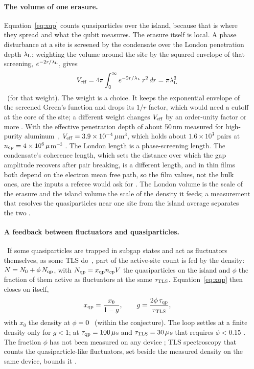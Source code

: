 \paragraph{The volume of one erasure.} Equation~\eqref{eq:xqp} counts quasiparticles over the island, because that is where they
spread and what the qubit measures. The erasure itself is local. A phase disturbance at a site is screened by the condensate over the
London penetration depth $\lambda_{\mathrm L}$; weighting the volume around the site by the squared envelope of that screening, $e^{-2r/\lambda_{\mathrm L}}$,
gives
\begin{equation}V_{\rm eff}=4\pi\int_0^\infty e^{-2r/\lambda_{\mathrm L}}\,r^2\,dr=\pi\lambda_{\mathrm L}^3\label{eq:xqp_veff}\end{equation}
\derived\ (for that weight). The weight is a choice. It keeps the exponential envelope of the screened Green's function and drops its
$1/r$ factor, which would need a cutoff at the core of the site; a different weight changes $V_{\rm eff}$ by an order-unity factor or
more \interp. With the effective penetration depth of about 50\,nm measured for high-purity aluminum~\cite{Ganjam2024},
$V_{\rm eff}=3.9\times10^{-4}\,\mu$m$^3$, which holds about $1.6\times10^{3}$ pairs at $n_{\rm cp}=4\times10^{6}\,\mu$m$^{-3}$ \calc. The
London length is a phase-screening length. The condensate's coherence length, which sets the distance over which the gap amplitude
recovers after pair breaking, is a different length, and in thin films both depend on the electron mean free path, so the film values,
not the bulk ones, are the inputs a referee would ask for \interp. The London volume is the scale of the erasure and the island volume the
scale of the density it feeds; a measurement that resolves the quasiparticles near one site from the island average separates the two
\openprob.

\paragraph{A feedback between fluctuators and quasiparticles.} \conjecture\ If some quasiparticles are trapped in subgap states and act as
fluctuators themselves, as some TLS do~\cite{deGraaf2020}, part of the active-site count is fed by the density: $N=N_0+\phi\,N_{\rm qp}$,
with $N_{\rm qp}=x_{\rm qp}n_{\rm cp}V$ the quasiparticles on the island and $\phi$ the fraction of them active as fluctuators at the
same $\tau_{\rm TLS}$. Equation~\eqref{eq:xqp} then closes on itself,
\begin{equation}x_{\rm qp}=\frac{x_0}{1-g},\qquad g=\frac{2\phi\,\tau_{\rm qp}}{\tau_{\rm TLS}},\label{eq:xqp_feedback}\end{equation}
with $x_0$ the density at $\phi=0$ \derived\ (within the conjecture). The loop settles at a finite density only for $g<1$; at
$\tau_{\rm qp}=100\,\mu$s and $\tau_{\rm TLS}=30\,\mu$s that requires $\phi<0.15$ \calc. The fraction $\phi$ has not been measured on any
device \openprob; TLS spectroscopy that counts the quasiparticle-like fluctuators, set beside the measured density on the same device,
bounds it \interp.

